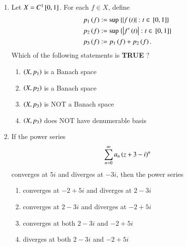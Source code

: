 \documentclass[journal]{IEEEtran}
\begin{document}
\begin{enumerate}
\item Let $X = C^1{}\left[0, 1\right]$. For each $f \in X$, define
\begin{align*}
    p_1\left(f\right) & := \sup\ \{\left\vert f\left(t\right)\right\vert: t \in {}\left[0, 1\right]\} \\
    p_2\left(f\right) & := \sup\ \{\left\vert f'\left(t\right)\right\vert: t \in {}\left[0, 1\right]\} \\
    p_3\left(f\right) & := p_1\left(f\right) + p_2\left(f\right).
\end{align*}
Which of the following statements is \textbf{TRUE} ?
\begin{enumerate}
    \item $\left(X, p_1\right)$ is a Banach space
    \item $\left(X, p_2\right)$ is a Banach space
    \item $\left(X, p_3\right)$ is NOT a Banach space
    \item $\left(X, p_3\right)$ does NOT have denumerable basis \\
\end{enumerate}
\item If the power series
\begin{align*}
    \sum_{n=0}^{\infty} a_n\left(z + 3 - i\right)^n
\end{align*}
converges at $5i$ and diverges at $-3i$, then the power series
\begin{enumerate}
    \item converges at $-2 + 5i$ and diverges at $2 - 3i$
    \item converges at $2 - 3i$ and diverges at $-2 + 5i$
    \item converges at both $2 - 3i$ and $-2 + 5i$
    \item diverges at both $2 - 3i$ and $-2 + 5i$ \\
\end{enumerate}
			 \end{enumerate}
			 
\end{document}
